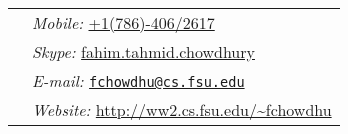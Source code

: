 \documentclass[margin,line]{res}
\begin{document}

\begin{tabular}{@{}p{3.5in}p{4in}}
\hspace{1cm} & {\it Mobile:}  \href{tel:+17864062617}{+1(786)-406/2617} \\
\hspace{1cm} & {\it Skype:}  \href{skype:fahim.tahmid.chowdhury?call}{fahim.tahmid.chowdhury} \\
\hspace{1cm} & {\it E-mail:} \href{mailto:fchowdhu@cs.fsu.edu}{\nolinkurl{fchowdhu@cs.fsu.edu} } \\
\hspace{1cm} & {\it Website:} \href{http://ww2.cs.fsu.edu/~fchowdhu}{http://ww2.cs.fsu.edu/\textasciitilde fchowdhu} \\
\end{tabular}

\vspace*{-.2in}
\end{document}
